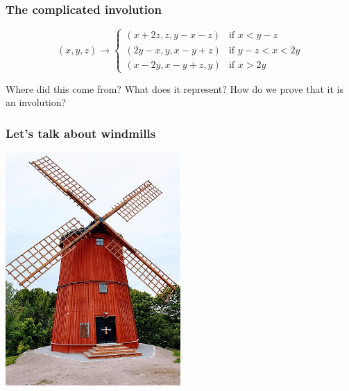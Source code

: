 \documentclass{beamer}
\begin{document}
\begin{frame}
	\frametitle{The complicated involution}

	\begin{equation*}
		(x,y,z) \rightarrow
		\begin{cases}
			(x + 2z, z, y - x - z) & \text{if } x < y-z \\
			(2y - x, y, x - y + z) & \text{if } y - z < x < 2y \\
			(x - 2y, x - y + z, y) & \text{if } x > 2y
		\end{cases}
	\end{equation*}

	Where did this come from? What does it represent? How do we prove that it is an involution?
\end{frame}

%
%
%

\begin{frame}
	\frametitle{Let's talk about windmills}
	\begin{center}
             \includegraphics[width=0.5\textwidth]{windmill.jpg}
        \end{center}
\end{frame}
\end{document}
